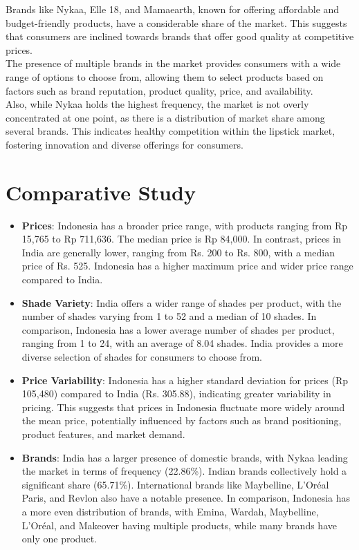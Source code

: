 \documentclass{article}
\begin{document}
\noindent Brands like Nykaa, Elle 18, and Mamaearth, known for offering affordable and budget-friendly products, have a considerable share of the market. This suggests that consumers are inclined towards brands that offer good quality at competitive prices.\\

\noindent The presence of multiple brands in the market provides consumers with a wide range of options to choose from, allowing them to select products based on factors such as brand reputation, product quality, price, and availability.\\

\noindent Also, while Nykaa holds the highest frequency, the market is not overly concentrated at one point, as there is a distribution of market share among several brands. This indicates healthy competition within the lipstick market, fostering innovation and diverse offerings for consumers.

\section{Comparative Study}

\begin{itemize}
    \item \textbf{Prices}: Indonesia has a broader price range, with products ranging from Rp 15,765 to Rp 711,636. The median price is Rp 84,000. In contrast, prices in India are generally lower, ranging from Rs. 200 to Rs. 800, with a median price of Rs. 525. Indonesia has a higher maximum price and wider price range compared to India.
    \item \textbf{Shade Variety}: India offers a wider range of shades per product, with the number of shades varying from 1 to 52 and a median of 10 shades. In comparison, Indonesia has a lower average number of shades per product, ranging from 1 to 24, with an average of 8.04 shades. India provides a more diverse selection of shades for consumers to choose from.
    \item \textbf{Price Variability}: Indonesia has a higher standard deviation for prices (Rp 105,480) compared to India (Rs. 305.88), indicating greater variability in pricing. This suggests that prices in Indonesia fluctuate more widely around the mean price, potentially influenced by factors such as brand positioning, product features, and market demand.
    \item \textbf{Brands}: India has a larger presence of domestic brands, with Nykaa leading the market in terms of frequency (22.86\%). Indian brands collectively hold a significant share (65.71\%). International brands like Maybelline, L'Oréal Paris, and Revlon also have a notable presence. In comparison, Indonesia has a more even distribution of brands, with Emina, Wardah, Maybelline, L'Oréal, and Makeover having multiple products, while many brands have only one product.
\end{itemize}

\newpage



\newpage

\end{document}

